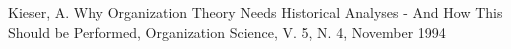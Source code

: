 \documentclass[
12pt,		%
openright,	%
twoside,  %
a4paper,			%
chapter=TITLE,		%
english,			%
french,				%
spanish,			%
brazil				%
]{USPSC-classe/USPSC}
\begin{document}
\begin{flushleft}
\begin{flushleft}
\begin{flushleft}
\begin{flushleft}
\begin{flushleft}
\begin{flushleft}
\begin{flushleft}
\begin{flushleft}
\begin{flushleft}
\begin{flushleft}
[Kieser, 1994] Kieser, A. Why Organization Theory Needs Historical Analyses - And How This Should be Performed, Organization Science, V. 5, N. 4, November 1994
\end{flushleft}


\end{flushleft}


\end{flushleft}


\end{flushleft}


\end{flushleft}


\end{flushleft}


\end{flushleft}


\end{flushleft}


\end{flushleft}


\end{flushleft}
\end{document}
